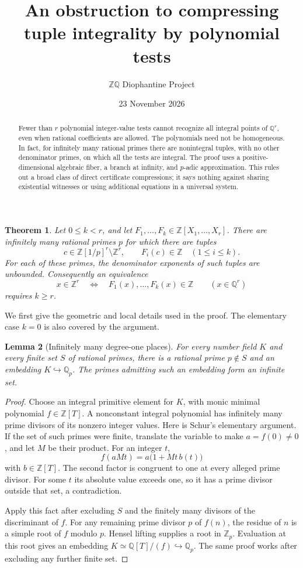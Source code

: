 \documentclass[11pt]{article}
\title{An obstruction to compressing tuple integrality by polynomial tests}
\author{\(\mathbb Z\mathbb Q\) Diophantine Project}
\date{23 November 2026}
\newtheorem{theorem}{Theorem}
\newtheorem{lemma}[theorem]{Lemma}
\newcommand{\Q}{\mathbb Q}\newcommand{\Z}{\mathbb Z}
\begin{document}
\maketitle
\begin{abstract}
Fewer than $r$ polynomial integer-value tests cannot recognize all integral
points of $\Q^r$, even when rational coefficients are allowed. The
polynomials need not be homogeneous. In fact, for
infinitely many rational primes there are nonintegral tuples, with no
other denominator primes, on which all the tests are integral. The proof
uses a positive-dimensional algebraic fiber, a branch at infinity, and
$p$-adic approximation. This rules out a broad class of direct certificate
compressions; it says nothing against sharing existential witnesses or
using additional equations in a universal system.
\end{abstract}

\begin{theorem}\label{main}
Let $0\le k<r$, and let $F_1,\ldots,F_k\in\Z[X_1,\ldots,X_r]$.
There are infinitely many rational primes $p$ for which there are tuples
\[
 c\in\Z[1/p]^r\setminus\Z^r,
 \qquad F_i(c)\in\Z\quad(1\le i\le k).
\]
For each of these primes, the denominator exponents of such tuples are
unbounded. Consequently an equivalence
\[
 x\in\Z^r\quad\Longleftrightarrow\quad
 F_1(x),\ldots,F_k(x)\in\Z
 \qquad(x\in\Q^r)
\]
requires $k\ge r$.
\end{theorem}

We first give the geometric and local details used in the proof.
The elementary case $k=0$ is also covered by the argument.

\begin{lemma}[Infinitely many degree-one places]\label{places}
For every number field $K$ and every finite set $S$ of rational primes,
there is a rational prime $p\notin S$ and an embedding $K\hookrightarrow\Q_p$.
The primes admitting such an embedding form an infinite set.
\end{lemma}
\begin{proof}
Choose an integral primitive element for $K$, with monic minimal polynomial
$f\in\Z[T]$. A nonconstant integral polynomial has infinitely many prime
divisors of its nonzero integer values. Here is Schur's elementary argument.
If the set of such primes were finite, translate the variable to make
$a=f(0)\ne0$, and let $M$ be their product. For an integer $t$,
\[
 f(aMt)=a\bigl(1+Mt\,b(t)\bigr)
\]
with $b\in\Z[T]$. The second factor is congruent to one at every alleged
prime divisor. For some $t$ its absolute value exceeds one, so it has a
prime divisor outside that set, a contradiction.

Apply this fact after excluding $S$ and the finitely many divisors of the
discriminant of $f$. For any remaining prime divisor $p$ of $f(n)$, the
residue of $n$ is a simple root of $f$ modulo $p$. Hensel lifting supplies
a root in $\Z_p$. Evaluation at this root gives an embedding
$K\simeq\Q[T]/(f)\hookrightarrow\Q_p$. The same proof works after
excluding any further finite set.
\end{proof}
\end{document}
